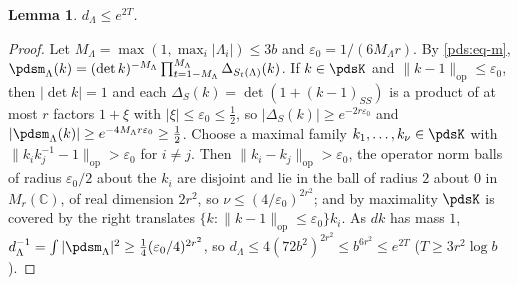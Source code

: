 \documentclass[10pt]{amsart}
\newtheorem{lemma}[theorem]{Lemma}
\theoremstyle{definition}
\theoremstyle{remark}
\newcommand{\C}{\mathbb C}
\begin{document}
\begin{lemma}\label{pbp:dLambda}
$d_\Lambda\le e^{2T}$.
\end{lemma}
\begin{proof}
Let $M_\Lambda=\max(1,\max_i|\Lambda_i|)\le3b$ and $\varepsilon_0=1/(6M_\Lambda r)$. By
\eqref{pds:eq-m}, $\pdsm_\Lambda(k)=(\det k)^{-M_\Lambda}\prod_{t=1-M_\Lambda}^{M_\Lambda}\Delta_{S_t
(\Lambda)}(k)$. If $k\in\pdsK$ and $\|k-1\|_{\mathrm{op}}\le\varepsilon_0$, then $|\det k|=1$ and each
$\Delta_S(k)=\det(1+(k-1)_{SS})$ is a product of at most $r$ factors $1+\xi$ with $|\xi|\le\varepsilon_0
\le\frac12$, so $|\Delta_S(k)|\ge e^{-2r\varepsilon_0}$ and $|\pdsm_\Lambda(k)|\ge e^{-4M_\Lambda r
\varepsilon_0}\ge\frac12$. Choose a maximal family $k_1,\dots,k_\nu\in\pdsK$ with $\|k_ik_j^{-1}-1\|_{
\mathrm{op}}>\varepsilon_0$ for $i\ne j$. Then $\|k_i-k_j\|_{\mathrm{op}}>\varepsilon_0$, the operator norm
balls of radius $\varepsilon_0/2$ about the $k_i$ are disjoint and lie in the ball of radius $2$ about
$0$ in $M_r(\C)$, of real dimension $2r^2$, so $\nu\le(4/\varepsilon_0)^{2r^2}$; and by maximality
$\pdsK$ is covered by the right translates $\{k:\|k-1\|_{\mathrm{op}}\le\varepsilon_0\}k_i$. As $dk$ has
mass $1$, $d_\Lambda^{-1}=\int|\pdsm_\Lambda|^2\ge\frac14(\varepsilon_0/4)^{2r^2}$, so $d_\Lambda\le
4(72b^2)^{2r^2}\le b^{6r^2}\le e^{2T}$ ($T\ge3r^2\log b$).
\end{proof}
\end{document}

